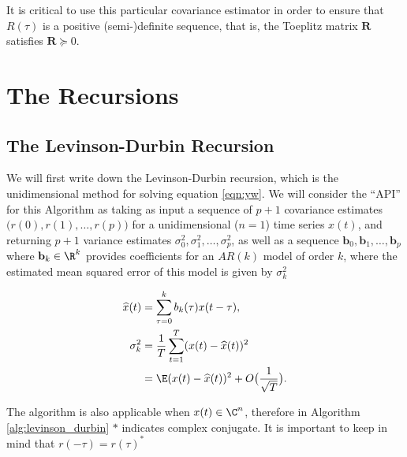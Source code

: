 \documentclass[12pt]{article}
\begin{document}
It is critical to use this particular covariance estimator in order to
ensure that $R(\tau)$ is a positive (semi-)definite sequence, that is,
the Toeplitz matrix $\mathbf{R}$ satisfies $\mathbf{R} \succeq 0$.

\section{The Recursions}

\subsection{The Levinson-Durbin Recursion}
We will first write down the Levinson-Durbin recursion, which is the
unidimensional method for solving equation \ref{eqn:yw}.  We will
consider the ``API'' for this Algorithm as taking as input a sequence
of $p + 1$ covariance estimates $\big(r(0), r(1), \ldots, r(p)\big)$ for a
unidimensional ($n = 1$) time series $x(t)$, and returning $p + 1$
variance estimates $\sigma_0^2, \sigma_1^2, \ldots, \sigma_p^2$, as
well as a sequence $\mathbf{b}_0, \mathbf{b}_1, \ldots, \mathbf{b}_p$
where $\mathbf{b}_k \in \R^{k}$ provides coefficients for an $AR(k)$
model of order $k$, where the estimated mean squared error of this
model is given by $\sigma_k^2$

\begin{equation}
  \begin{aligned}
    \widehat{x}(t) &= \sum_{\tau = 0}^k b_k(\tau) x(t - \tau),\\
    \sigma_k^2 &= \frac{1}{T}\sum_{t = 1}^T (x(t) - \widehat{x}(t))^2\\
    &= \E(x(t) - \widehat{x}(t))^2 + O\big(\frac{1}{\sqrt{T}}\big).
  \end{aligned}
\end{equation}

The algorithm is also applicable when $x(t) \in \C^n$, therefore in
Algorithm \ref{alg:levinson_durbin} $*$ indicates complex
conjugate.  It is important to keep in mind that
$r(-\tau) = r(\tau)^*$
\end{document}
